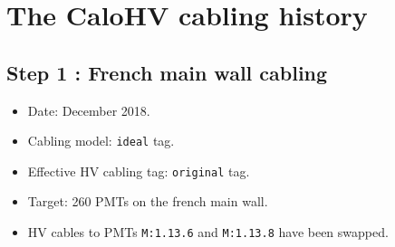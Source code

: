 
\clearpage
\section{The CaloHV cabling history}


\subsection{Step 1 : French main wall cabling}

\begin{itemize}
\item Date: December 2018.
\item Cabling model: \texttt{ideal} tag.
\item Effective HV cabling tag: \texttt{original} tag.
\item Target: 260 PMTs on the french main wall.
\item HV cables to PMTs \verb+M:1.13.6+ and \verb+M:1.13.8+ have been swapped.
\end{itemize}


